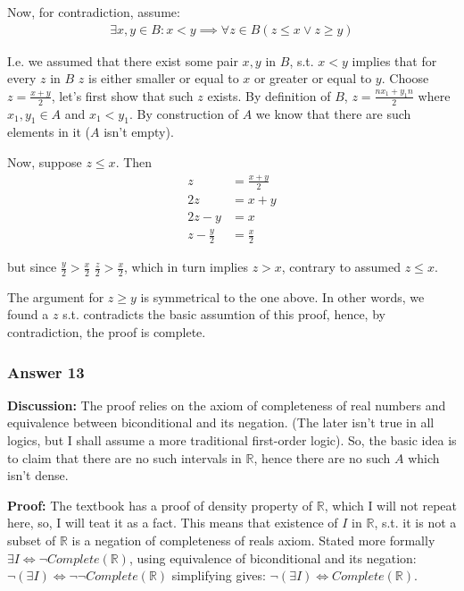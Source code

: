 \documentclass[11pt]{article}
\begin{document}
Now, for contradiction, assume:
\begin{equation*}
  \begin{aligned}
    \exists x, y \in B: x < y
    \implies \forall z \in B (z \leq x \lor z \geq y)
  \end{aligned}
\end{equation*}

I.e. we assumed that there exist some pair $x, y$ in $B$, s.t. $x < y$
implies that for every $z$ in $B$ $z$ is either smaller or equal to $x$ or
greater or equal to $y$.  Choose $z=\frac{x+y}{2}$, let's first show that
such $z$ exists.  By definition of $B$, $z=\frac{nx_1+y_1n}{2}$ where
$x_1, y_1 \in A$ and $x_1 < y_1$.  By construction of $A$ we know that
there are such elements in it ($A$ isn't empty).

Now, suppose $z \leq x$.  Then
\begin{equation*}
  \begin{aligned}
    z      &= \frac{x + y}{2} \\
    2z     &= x + y \\
    2z - y &= x \\
    z - \frac{y}{2} &= \frac{x}{2}
  \end{aligned}
\end{equation*}

but since $\frac{y}{2} > \frac{x}{2}$ $\frac{z}{2} > \frac{x}{2}$, which
in turn implies $z > x$, contrary to assumed $z \leq x$.

The argument for $z \geq y$ is symmetrical to the one above.  In other
words, we found a $z$ s.t. contradicts the basic assumtion of this proof,
hence, by contradiction, the proof is complete.
\subsubsection{Answer 13}
\label{sec-1-6-2}
\textbf{Discussion:} The proof relies on the axiom of completeness of real numbers
and equivalence between biconditional and its negation.  (The later isn't
true in all logics, but I shall assume a more traditional first-order logic).
So, the basic idea is to claim that there are no such intervals in $\mathbb{R}$,
hence there are no such $A$ which isn't dense.

\textbf{Proof:} The textbook has a proof of density property of $\mathbb{R}$, which
I will not repeat here, so, I will teat it as a fact.  This means that existence
of $I$ in $\mathbb{R}$, s.t. it is not a subset of $\mathbb{R}$ is a negation
of completeness of reals axiom.  Stated more formally
$\exists I \iff \lnot Complete(\mathbb{R})$, using equivalence of biconditional
and its negation: $\lnot (\exists I) \iff \lnot \lnot Complete(\mathbb{R})$
simplifying gives: $\lnot (\exists I) \iff Complete(\mathbb{R})$.
\end{document}
